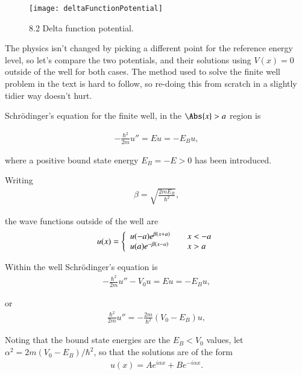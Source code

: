 \begin{figure}[htp]
\centering
\texttt{[image: deltaFunctionPotential]}
\caption{8.2 Delta function potential.}\label{fig:deltaFunctionPotential}
\end{figure}

The physics isn't changed by picking a different point for the reference energy level, so let's compare the two potentials, and their solutions using $V(x) = 0$ outside of the well for both cases.  The method used to solve the finite well problem in the text is hard to follow, so re-doing this from scratch in a slightly tidier way doesn't hurt.

Schr\"{o}dinger's equation for the finite well, in the $\Abs{x} > a$ region is

\begin{align}\label{eqn:qmIproblemSet4:110}
-\frac{\hbar^2}{2m} u'' = E u = - E_B u,
\end{align}

where a positive bound state energy $E_B = -E > 0$ has been introduced.

Writing 
\begin{align}\label{eqn:qmIproblemSet4:115}
\beta = \sqrt{\frac{2 m E_B}{\hbar^2}},
\end{align}

the wave functions outside of the well are 
\begin{align}\label{eqn:qmIproblemSet4:120}
u(x) =
\left\{
\begin{array}{l l}
u(-a) e^{\beta(x+a)} &\quad \mbox{$x < -a$} \\
u(a) e^{-\beta(x-a)} &\quad \mbox{$x > a$} \\
\end{array}
\right.
\end{align}

Within the well Schr\"{o}dinger's equation is
\begin{align}\label{eqn:qmIproblemSet4:125}
-\frac{\hbar^2}{2m} u'' - V_0 u = E u = - E_B u,
\end{align}

or
\begin{align}\label{eqn:qmIproblemSet4:126}
\frac{\hbar^2}{2m} u'' = - \frac{2m}{\hbar^2} (V_0 - E_B) u,
\end{align}

Noting that the bound state energies are the $E_B < V_0$ values, let $\alpha^2 = 2m (V_0 - E_B)/\hbar^2$, so that the solutions are of the form
\begin{align}\label{eqn:qmIproblemSet4:130}
u(x) = A e^{i\alpha x} + B e^{-i\alpha x}.
\end{align}

